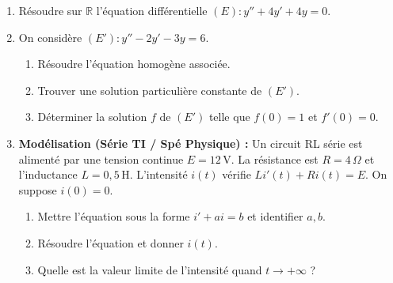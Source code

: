 \documentclass[11pt]{article}
\begin{document}
\begin{exercice}
\begin{enumerate}
\item Résoudre sur $\mathbb{R}$ l'équation différentielle $(E) : y'' + 4y' + 4y = 0$.
\item On considère $(E') : y'' - 2y' - 3y = 6$.
\begin{enumerate}
\item Résoudre l'équation homogène associée.
\item Trouver une solution particulière constante de $(E')$.
\item Déterminer la solution $f$ de $(E')$ telle que $f(0) = 1$ et $f'(0) = 0$.
\end{enumerate}
\item \textbf{Modélisation (Série TI / Spé Physique) :} Un circuit RL série est alimenté par une tension continue $E = 12\,\mathrm{V}$. La résistance est $R = 4\,\Omega$ et l'inductance $L = 0{,}5\,\mathrm{H}$. L'intensité $i(t)$ vérifie $L i'(t) + R i(t) = E$. On suppose $i(0) = 0$.
\begin{enumerate}
\item Mettre l'équation sous la forme $i' + ai = b$ et identifier $a, b$.
\item Résoudre l'équation et donner $i(t)$.
\item Quelle est la valeur limite de l'intensité quand $t \to +\infty$ ?
\end{enumerate}
\end{enumerate}
\end{exercice}
\end{document}
